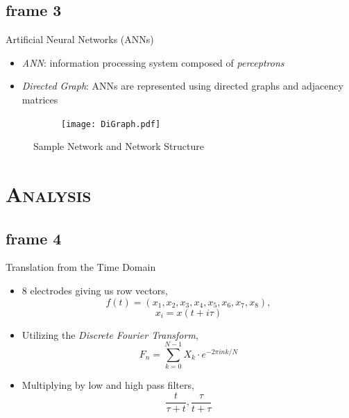 \documentclass[xcolor=x11names,compress]{beamer}
\renewcommand{\(}{\begin{columns}}
\renewcommand{\)}{\end{columns}}
\newcommand{\<}[1]{\begin{column}{#1}}
\renewcommand{\>}{\end{column}}
\begin{document}
\subsection{frame 3}
\begin{frame}{Artificial Neural Networks (ANNs)}
\begin{itemize}
\item \textit{ANN}: information processing system composed of \textit{perceptrons}
\item \textit{Directed Graph}: ANNs are represented using directed graphs and adjacency matrices
\end{itemize}
\begin{figure}
\centering
\begin{subfigure}[c]{0.4\linewidth}
\texttt{[image: DiGraph.pdf]}
\end{subfigure}
\hspace{8mm}
\begin{subfigure}[c]{0.3\linewidth}
  \end{subfigure}
  \hspace{10mm}
\caption{Sample Network and Network Structure}
\end{figure}
\end{frame}
\section{\scshape Analysis}
\subsection{frame 4}
\begin{frame}{Translation from the Time Domain}

\begin{itemize}
\item
8 electrodes giving us row vectors, $$f(t) = (x_1,x_2,x_3,x_4,x_5,x_6,x_7,x_8),$$ $$x_i=x(t+i\tau)$$
\item
Utilizing the \textit{Discrete Fourier Transform}, $$F_n=\sum_{k=0}^{N-1}X_k  \cdot  e^{-2\pi i n k/N}$$
\item
Multiplying by low and high pass filters, $$\frac{t}{\tau + t},\frac{\tau}{t+\tau}$$
\end{itemize}
\end{frame}
\end{document}
